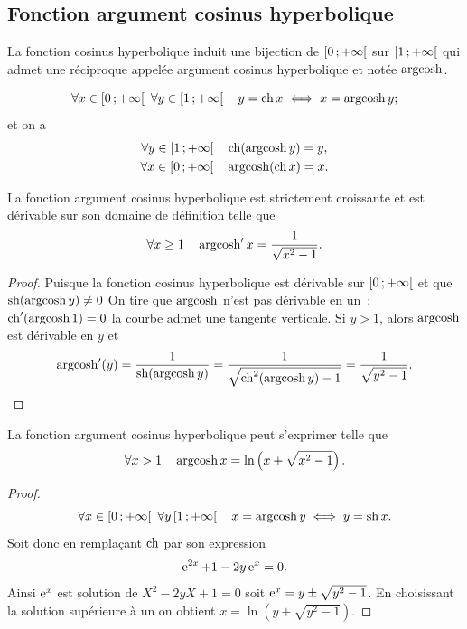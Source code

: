 \subsection{Fonction argument cosinus hyperbolique}
\label{subsec:chap1-fonctionargcosh}
\begin{defdef}
  La fonction cosinus hyperbolique induit une bijection de $\left[ 0 \, ;  +\infty \right[$ sur $\left[ 1 \, ;  +\infty \right[$ qui admet une réciproque appelée argument cosinus hyperbolique et notée $\operatorname{argcosh}$.
\end{defdef}
%
\begin{prop}
  \begin{equation}
    \forall x \in \left[ 0 \, ;  +\infty \right[ \ \forall y \in \left[ 1 \, ;  +\infty \right[ \quad y=\operatorname{ch} x \iff x = \operatorname{argcosh} y ;
  \end{equation}
  et on a
  \begin{gather}
    \forall y \in \left[ 1 \, ;  +\infty \right[ \quad \operatorname{ch}(\operatorname{argcosh} y) = y, \\
    \forall x \in \left[ 0 \, ;  +\infty \right[ \quad \operatorname{argcosh}(\operatorname{ch} x) = x.
  \end{gather}
\end{prop}
%
\begin{prop}
  La fonction argument cosinus hyperbolique est strictement croissante et est dérivable sur son domaine de définition telle que
  \begin{equation}
    \forall x\geq{}1 \quad \operatorname{argcosh}' x =\frac{1}{\sqrt{x^2-1}}.
  \end{equation}
\end{prop}
\begin{proof}
  Puisque la fonction cosinus hyperbolique est dérivable sur $\left[ 0 \, ;  +\infty \right[$ et que $\operatorname{sh}(\operatorname{argcosh} y) \neq 0$ On tire que $\operatorname{argcosh}$ n'est pas dérivable en un~: $\operatorname{ch}'(\operatorname{argcosh} 1)=0$ la courbe admet une tangente verticale. Si $y>1$, alors $\operatorname{argcosh}$ est dérivable en $y$ et
  \begin{equation}
    \operatorname{argcosh}'(y)=\frac{1}{\operatorname{sh}(\operatorname{argcosh} y)}=\frac{1}{\sqrt{\operatorname{ch}^2(\operatorname{argcosh} y)-1}}=\frac{1}{\sqrt{y^2-1}}.
  \end{equation}
\end{proof}
%
\begin{prop} La fonction argument cosinus hyperbolique peut s'exprimer telle que
  \begin{equation}
    \forall x>1 \quad \operatorname{argcosh} x = \ln \left(x +\sqrt{x^2-1}\right).
  \end{equation}
\end{prop}
\begin{proof}
  \begin{equation}
    \forall x \in \Rplus \ \forall y \intervallefo{1}{+\infty} \quad x=\argch y \iff y=\hsin x.
  \end{equation}
  Soit donc en remplaçant $\operatorname{ch}$ par son expression
  \begin{equation}
    \operatorname{e}^{2x} +1 - 2y\operatorname{e}^x =0.
  \end{equation}
  Ainsi $\operatorname{e}^x$ est solution de $X^2-2yX+1=0$ soit $\operatorname{e}^x = y \pm \sqrt{y^2-1}$. En choisissant la solution supérieure à un on obtient $x=\ln \left(y+\sqrt{y^2-1} \right)$.
\end{proof}
